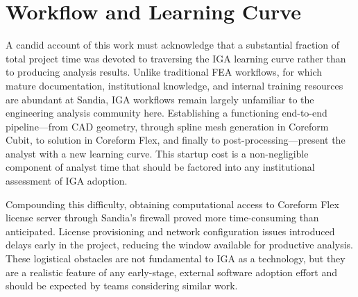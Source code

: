 \documentclass[12pt,report,justified]{SANDreport}
\begin{document}

\section{Workflow and Learning Curve}

A candid account of this work must acknowledge that a substantial fraction of total
project time was devoted to traversing the IGA learning curve rather than to producing
analysis results.  Unlike traditional FEA workflows, for which mature documentation,
institutional knowledge, and internal training resources are abundant at Sandia, IGA
workflows remain largely unfamiliar to the engineering analysis community here.  
Establishing a functioning end-to-end pipeline---from CAD geometry, through spline mesh
generation in Coreform Cubit, to solution in Coreform Flex, and finally to
post-processing---present the analyst with a new learning curve.  This startup cost
is a non-negligible component of analyst time that should be factored into any
institutional assessment of IGA adoption.

Compounding this difficulty, obtaining computational access to Coreform Flex license server through Sandia's firewall proved more time-consuming than anticipated.  License
provisioning and network configuration issues introduced delays early in the project,
reducing the window available for productive analysis.  These logistical obstacles are
not fundamental to IGA as a technology, but they are a realistic feature of any
early-stage, external software adoption effort and should be expected by teams considering similar work.
\end{document}
